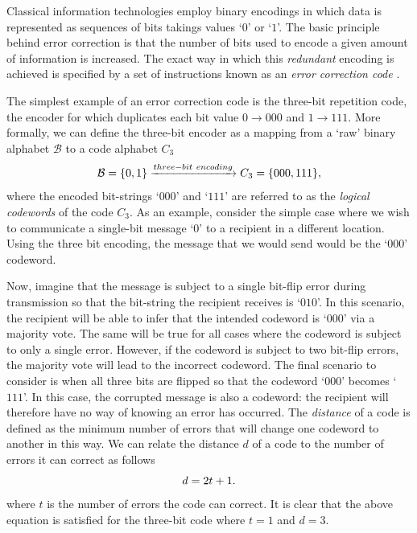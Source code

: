 \documentclass[]{arxiv}
\theoremstyle{plain}%
\theoremstyle{definition}
\theoremstyle{remark}
\begin{document}
Classical information technologies employ binary encodings in which data is represented as sequences of bits takings values  `$0$' or `$1$'. The basic principle behind error correction is that the number of bits used to encode a given amount of information is increased. The exact way in which this \textit{redundant} encoding is achieved is specified by a set of instructions known as an \textit{error correction code} \cite{Hamming50,MacKay03a}.

The simplest example of an error correction code is the three-bit repetition code, the encoder for which duplicates each bit value $0\rightarrow 000$ and $1\rightarrow111$. More formally, we can define the three-bit encoder as a mapping from a `raw' binary alphabet $\mathcal{B}$ to a code alphabet $C_3$
%
\begin{equation}
\mathcal{B}=\{0,1\} \xrightarrow{three-bit \ encoding} C_{\rm 3} =\{000,111\}\rm,
\end{equation}        
%
where the encoded bit-strings `$000$' and `$111$' are referred to as the \textit{logical codewords} of the code $C_3$. As an example, consider the simple case where we wish to communicate a single-bit message `$0$' to a recipient in a different location. Using the three bit encoding, the message that we would send would be the `$000$' codeword.  


Now, imagine that the message is subject to a single bit-flip error during transmission so that the bit-string the recipient receives is `$010$'. In this scenario, the recipient will be able to infer that the intended codeword is `$000$' via a majority vote. The same will be true for all cases where the codeword is subject to only a single error. However, if the codeword is subject to two bit-flip errors, the majority vote will lead to the incorrect codeword. The final scenario to consider is when all three bits are flipped so that the codeword `$000$' becomes `$111$'. In this case, the corrupted message is also a codeword: the recipient will therefore have no way of knowing an error has occurred. The \textit{distance} of a code is defined as the minimum number of errors that will change one codeword to another in this way. We can relate the distance $d$ of a code to the number of errors it can correct as follows
%
\begin{equation}
d=2t+1\rm.
\end{equation}
%
where $t$ is the number of errors the code can correct. It is clear that the above equation is satisfied for the three-bit code where $t=1$ and $d=3$.
\end{document}
